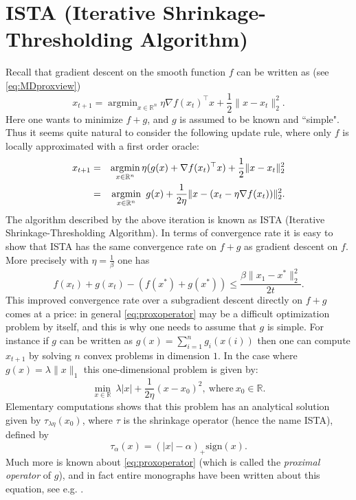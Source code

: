 \documentclass[openany]{now}
\newcommand{\argmin}{\mathop{\mathrm{argmin}}}
\begin{document}
\section*{ISTA (Iterative Shrinkage-Thresholding Algorithm)}
Recall that gradient descent on the smooth function $f$ can be written as (see \eqref{eq:MDproxview})
$$x_{t+1} = \argmin_{x \in \mathbb{R}^n} \eta \nabla f(x_t)^{\top} x + \frac{1}{2} \|x - x_t\|^2_2 .$$
Here one wants to minimize $f+g$, and $g$ is assumed to be known and ``simple". Thus it seems quite natural to consider the following update rule, where only $f$ is locally approximated with a first order oracle:
\begin{eqnarray}
x_{t+1} & = & \argmin_{x \in \mathbb{R}^n} \eta (g(x) + \nabla f(x_t)^{\top} x) + \frac{1}{2} \|x - x_t\|^2_2 \notag \\
& = & \argmin_{x \in \mathbb{R}^n} \ g(x) + \frac{1}{2\eta} \|x - (x_t - \eta \nabla f(x_t)) \|_2^2 . \label{eq:proxoperator}
\end{eqnarray}
The algorithm described by the above iteration is known as ISTA (Iterative Shrinkage-Thresholding Algorithm). In terms of convergence rate it is easy to show that ISTA has the same convergence rate on $f+g$ as gradient descent on $f$. More precisely with $\eta=\frac{1}{\beta}$ one has
$$f(x_t) + g(x_t) - (f(x^*) + g(x^*)) \leq \frac{\beta \|x_1 - x^*\|^2_2}{2 t} .$$
This improved convergence rate over a subgradient descent directly on $f+g$ comes at a price: in general \eqref{eq:proxoperator} may be a difficult optimization problem by itself, and this is why one needs to assume that $g$ is simple. For instance if $g$ can be written as $g(x) = \sum_{i=1}^n g_i(x(i))$ then one can compute $x_{t+1}$ by solving $n$ convex problems in dimension $1$. In the case where $g(x) = \lambda \|x\|_1$ this one-dimensional problem is given by:
$$\min_{x \in \mathbb{R}} \ \lambda |x| + \frac{1}{2 \eta}(x - x_0)^2, \ \text{where} \ x_0 \in \mathbb{R} .$$
Elementary computations shows that this problem has an analytical solution given by $\tau_{\lambda \eta}(x_0)$,
where $\tau$ is the shrinkage operator (hence the name ISTA), defined by
$$\tau_{\alpha}(x) = (|x|-\alpha)_+ \mathrm{sign}(x) .$$
Much more is known about \eqref{eq:proxoperator} (which is called the {\em proximal operator} of $g$), and in fact entire monographs have been written about this equation, see e.g. \cite{PB13, BJMO12}.
\end{document}
